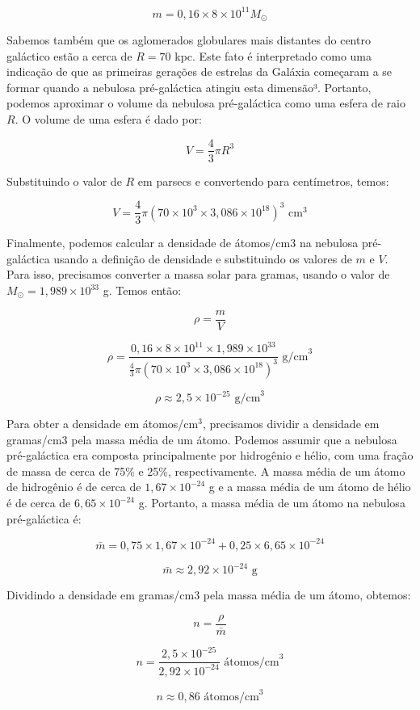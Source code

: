 \documentclass[a4paper,12pt]{article}
\begin{document}
\begin{enumerate}
\begin{enumerate}
$$m = 0,16 \times 8 \times 10^{11} M_{\odot}$$

Sabemos também que os aglomerados globulares mais distantes do centro galáctico estão a cerca de $R=70$ kpc. Este fato é interpretado como uma indicação de que as primeiras gerações de estrelas da Galáxia começaram a se formar quando a nebulosa pré-galáctica atingiu esta dimensão³. Portanto, podemos aproximar o volume da nebulosa pré-galáctica como uma esfera de raio $R$. O volume de uma esfera é dado por:

$$V = \frac{4}{3}\pi R^3$$

Substituindo o valor de $R$ em parsecs e convertendo para centímetros, temos:

$$V = \frac{4}{3}\pi (70 \times 10^3 \times 3,086 \times 10^{18})^3 \text{ cm}^3$$

Finalmente, podemos calcular a densidade de átomos/cm3 na nebulosa pré-galáctica usando a definição de densidade e substituindo os valores de $m$ e $V$. Para isso, precisamos converter a massa solar para gramas, usando o valor de $M_{\odot} = 1,989 \times 10^{33}$ g. Temos então:

$$\rho = \frac{m}{V}$$

$$\rho = \frac{0,16 \times 8 \times 10^{11} \times 1,989 \times 10^{33}}{\frac{4}{3}\pi (70 \times 10^3 \times 3,086 \times 10^{18})^3} \text{ g/cm}^3$$

$$\rho \approx 2,5 \times 10^{-25} \text{ g/cm}^3$$

Para obter a densidade em átomos/cm$^3$, precisamos dividir a densidade em gramas/cm3 pela massa média de um átomo. Podemos assumir que a nebulosa pré-galáctica era composta principalmente por hidrogênio e hélio, com uma fração de massa de cerca de 75\% e 25\%, respectivamente. A massa média de um átomo de hidrogênio é de cerca de $1,67 \times 10^{-24}$ g e a massa média de um átomo de hélio é de cerca de $6,65\times 10^{-24}$ g. Portanto, a massa média de um átomo na nebulosa pré-galáctica é:

$$\bar{m} = 0,75 \times 1,67 \times 10^{-24} + 0,25 \times 6,65 \times 10^{-24}$$

$$\bar{m} \approx 2,92 \times 10^{-24} \text{ g}$$

Dividindo a densidade em gramas/cm3 pela massa média de um átomo, obtemos:

$$n = \frac{\rho}{\bar{m}}$$

$$n = \frac{2,5 \times 10^{-25}}{2,92 \times 10^{-24}} \text{ átomos/cm}^3$$

$$n \approx 0,86 \text{ átomos/cm}^3$$


\end{enumerate}
\end{enumerate}
\end{document}
